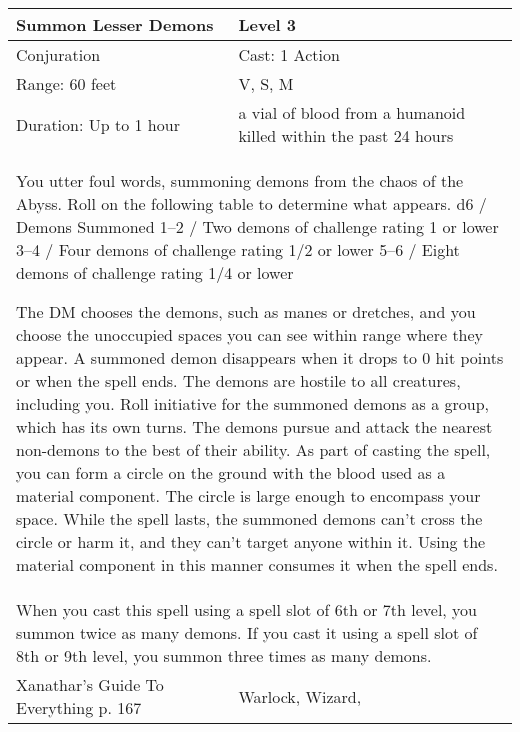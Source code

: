 \documentclass[11pt]{report}
\begin{document}
\begin{table}[H]
	\begin{tabular}{||p{6cm}|p{6cm}||}
		\hline\hline
		\bf{Summon Lesser Demons} & Level 3\\ \hline
		Conjuration & Cast: 1 Action\\ \hline
		Range: 60 feet & V, S, M\\ \hline
		Duration: Up to 1 hour & a vial of blood from a humanoid killed within the past 24 hours\\ \hline
		\multicolumn{2}{||p{12cm}||}{You utter foul words, summoning demons from the chaos of the Abyss. Roll on the following table to determine what appears.
d6 / Demons Summoned
1–2 / Two demons of challenge rating 1 or lower
3–4 / Four demons of challenge rating 1/2 or lower
5–6 / Eight demons of challenge rating 1/4 or lower

The DM chooses the demons, such as manes or dretches, and you choose the unoccupied spaces you can see within range where they appear. A summoned demon disappears when it drops to 0 hit points or when the spell ends.
The demons are hostile to all creatures, including you. Roll initiative for the summoned demons as a group, which has its own turns. The demons pursue and attack the nearest non-demons to the best of their ability.
As part of casting the spell, you can form a circle on the ground with the blood used as a material component. The circle is large enough to encompass your space. While the spell lasts, the summoned demons can’t cross the circle or harm it, and they can’t target anyone within it. Using the material component in this manner consumes it when the spell ends.}\\ \hline
		\multicolumn{2}{||p{12cm}||}{When you cast this spell using a spell slot of 6th or 7th level, you summon twice as many demons. If you cast it using a spell slot of 8th or 9th level, you summon three times as many demons.}\\ \hline
Xanathar's Guide To Everything p. 167 & Warlock, Wizard, \\ \hline\hline
	\end{tabular}
\end{table}
\end{document}
